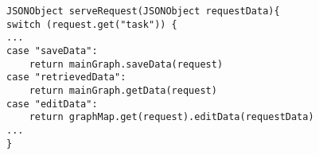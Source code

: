 \begin{lstlisting}[basicstyle=\footnotesize, frame=single, caption={Loading form data from FormConfiguration}, label=serveRequest, captionpos=b, belowskip=1em, aboveskip=2em]
JSONObject serveRequest(JSONObject requestData){
switch (request.get("task")) {
...
case "saveData": 
	return mainGraph.saveData(request)
case "retrievedData": 
	return mainGraph.getData(request)
case "editData": 
	return graphMap.get(request).editData(requestData)
...		
}
\end{lstlisting}
